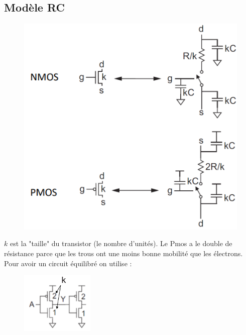\documentclass[resume]{subfiles}
\begin{document}
\begin{multicols}{3}
\subsection{Modèle RC}
\begin{figure}[H]
\centering
\includegraphics[width=\columnwidth]{img_40.png}
\end{figure}
$k$ est la "taille" du transistor (le nombre d'unités). Le Pmos a le double de résistance parce que les trous ont une moins bonne mobilité que les électrons. Pour avoir un circuit équilibré on utilise :
\begin{figure}[H]
\centering
\includegraphics[width=3.5cm]{img_41.png}
\end{figure}

\end{multicols}
\end{document}
